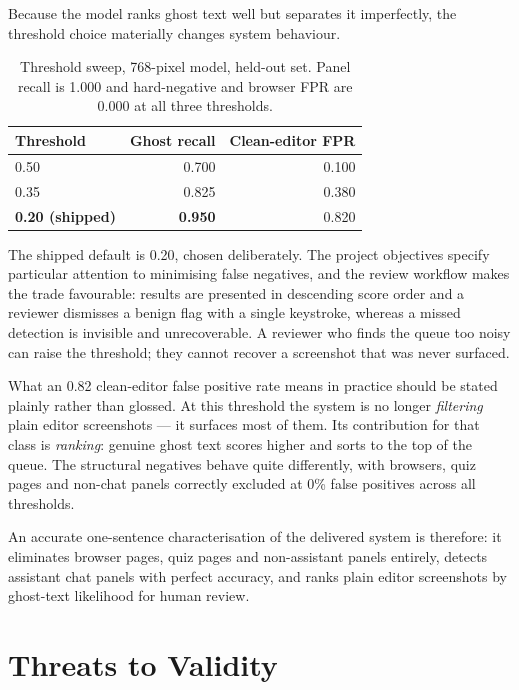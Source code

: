 \documentclass[12pt,oneside]{report}
\begin{document}
Because the model ranks ghost text well but separates it imperfectly, the
threshold choice materially changes system behaviour.

\begin{table}[h]
\centering
\caption{Threshold sweep, 768-pixel model, held-out set. Panel recall is 1.000 and hard-negative and browser FPR are 0.000 at all three thresholds.}
\begin{tabular}{@{}lrr@{}}
\toprule
\textbf{Threshold} & \textbf{Ghost recall} & \textbf{Clean-editor FPR} \\
\midrule
0.50 & 0.700 & 0.100 \\
0.35 & 0.825 & 0.380 \\
\textbf{0.20 (shipped)} & \textbf{0.950} & 0.820 \\
\bottomrule
\end{tabular}
\end{table}

The shipped default is 0.20, chosen deliberately. The project objectives
specify particular attention to minimising false negatives, and the review
workflow makes the trade favourable: results are presented in descending score
order and a reviewer dismisses a benign flag with a single keystroke, whereas a
missed detection is invisible and unrecoverable. A reviewer who finds the queue
too noisy can raise the threshold; they cannot recover a screenshot that was
never surfaced.

What an 0.82 clean-editor false positive rate means in practice should be
stated plainly rather than glossed. At this threshold the system is no longer
\emph{filtering} plain editor screenshots --- it surfaces most of them. Its
contribution for that class is \emph{ranking}: genuine ghost text scores higher
and sorts to the top of the queue. The structural negatives behave quite
differently, with browsers, quiz pages and non-chat panels correctly excluded
at 0\% false positives across all thresholds.

An accurate one-sentence characterisation of the delivered system is therefore:
it eliminates browser pages, quiz pages and non-assistant panels entirely,
detects assistant chat panels with perfect accuracy, and ranks plain editor
screenshots by ghost-text likelihood for human review.

\section{Threats to Validity}
\label{sec:validity}
\end{document}
